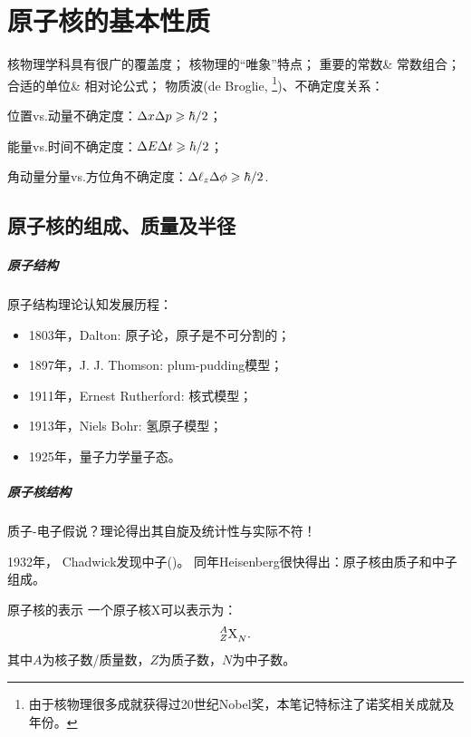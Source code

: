\chapter{原子核的基本性质}

核物理学科具有很广的覆盖度；
核物理的“唯象”特点；
重要的常数\& 常数组合；
合适的单位\& 相对论公式；
物质波(de Broglie, \footnote{由于核物理很多成就获得过20世纪Nobel奖，本笔记特标注了诺奖相关成就及年份。})、不确定度关系：
\begin{compactenum}
	\item 位置vs.动量不确定度：$\Delta x\Delta p\geqslant\hbar/2$；
	\item 能量vs.时间不确定度：$\Delta E\Delta t\geqslant\hbar/2$；
	\item 角动量分量vs.方位角不确定度：$\Delta \ell_z\Delta\phi\geqslant\hbar/2$.
\end{compactenum}

\section{原子核的组成、质量及半径}

\paragraph{原子结构}

原子结构理论认知发展历程：
\begin{itemize}
	\item 1803年，Dalton: 原子论，原子是不可分割的；
	\item 1897年，J. J. Thomson: plum-pudding模型；
	\item 1911年，Ernest Rutherford: 核式模型；
	\item 1913年，Niels Bohr: 氢原子模型；
	\item 1925年，量子力学量子态。
\end{itemize}

\paragraph{原子核结构}
质子-电子假说？理论得出其自旋及统计性与实际不符！

1932年， Chadwick发现中子()。
同年Heisenberg很快得出：原子核由质子和中子组成。

\begin{definition}{原子核的表示}{}
	一个原子核X可以表示为：
	\[
		{^{A}_{Z}\mathrm{X}}_N.
	\]
	其中$A$为核子数/质量数，$Z$为质子数，$N$为中子数。
	
\end{definition}

